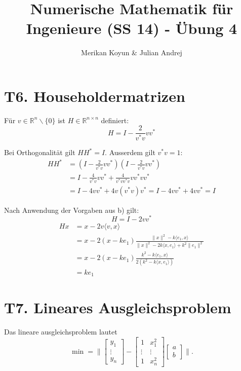 \documentclass[11pt]{article}
\theoremstyle{plain}
\theoremstyle{definition}
\renewcommand{\a}{\"{a}}
\renewcommand{\u}{\"{u}}
\begin{document}
\title{Numerische Mathematik f\u r Ingenieure (SS 14) - \"{U}bung 4}
\author{Merikan Koyun \& Julian Andrej}
\maketitle

\section*{T6. Householdermatrizen}
F\u r $v \in \mathbb{R}^n \backslash \{0\}$ ist $H \in \mathbb{R}^{n\times n}$ definiert:
\begin{equation}
H = I - \frac{2}{v^*v} vv^*
\end{equation}

Bei Orthogonalit\a t gilt $HH^*=I$. Ausserdem gilt $v^*v=1$:
\begin{align}
HH^* &= (I-\frac{2}{v^*v}vv^*)(I-\frac{2}{v^*v}vv^*) \\
&=  I - \frac{4}{v^*v}vv^* + \frac{4}{v^*v v^*v} vv^*vv^* \\
&= I - 4vv^* + 4v(v^*v)v^* = I-4vv^* + 4vv^* = I
\end{align}

Nach Anwendung der Vorgaben aus b) gilt:
\begin{equation}
  H = I - 2vv^*
\end{equation}
\begin{align}
  Hx &= x - 2 v \langle v,x \rangle \\
     &= x - 2(x - ke_1) \frac{\|x\|^2 - k\langle e_1, x \rangle}{\|x\|^2 - 2k \langle x, e_1\rangle + k^2 \| e_1 \|^2} \\
     &= x - 2(x-ke_1) \frac{k^2 - k \langle e_1, x \rangle}{2(k^2 - k \langle x, e_1 \rangle)} \\
     &= ke_1
\end{align}

\section*{T7. Lineares Ausgleichsproblem}

Das lineare ausgleichsproblem lautet
\begin{equation}
\min = \| \begin{bmatrix} y_1 \\ \vdots \\ y_n \end{bmatrix} -  \begin{bmatrix} 1 & x_1^2 \\ \vdots & \vdots \\ 1 & x_n^2  \end{bmatrix} \begin{bmatrix} a \\ b \end{bmatrix} \|.
\end{equation}
\end{document}
